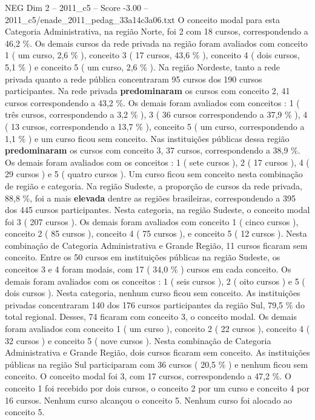\begin{textsample}{NEG Dim 2 – 2011\_c5 – Score -3.00 – 2011\_c5/enade\_2011\_pedag\_33a14c3a06.txt}
O conceito modal para esta Categoria Administrativa, na região Norte, foi 2 com 18 cursos, correspondendo a 46,2 \%.
Os demais cursos da rede privada na região foram avaliados com conceito 1 ( um curso, 2,6 \% ), conceito 3 ( 17 cursos, 43,6 \% ), conceito 4 ( dois cursos, 5,1 \% ) e conceito 5 ( um curso, 2,6 \% ).
Na região Nordeste, tanto a rede privada quanto a rede pública concentraram 95 cursos dos 190 cursos participantes.
Na rede privada \textbf{predominaram} os cursos com conceito 2, 41 cursos correspondendo a 43,2 \%.
Os demais foram avaliados com conceitos : 1 ( três cursos, correspondendo a 3,2 \% ), 3 ( 36 cursos correspondendo a 37,9 \% ), 4 ( 13 cursos, correspondendo a 13,7 \% ), conceito 5 ( um curso, correspondendo a 1,1 \% ) e um curso ficou sem conceito.
Nas instituições públicas dessa região \textbf{predominaram} os cursos com conceito 3, 37 cursos, correspondendo a 38,9 \%.
Os demais foram avaliados com os conceitos : 1 ( sete cursos ), 2 ( 17 cursos ), 4 ( 29 cursos ) e 5 ( quatro cursos ).
Um curso ficou sem conceito nesta combinação de região e categoria.
Na região Sudeste, a proporção de cursos da rede privada, 88,8 \%, foi a mais \textbf{elevada} dentre as regiões brasileiras, correspondendo a 395 dos 445 cursos participantes.
Nesta categoria, na região Sudeste, o conceito modal foi 3 ( 207 cursos ).
Os demais foram avaliados com conceito 1 ( cinco cursos ), conceito 2 ( 85 cursos ), conceito 4 ( 75 cursos ), e conceito 5 ( 12 cursos ).
Nesta combinação de Categoria Administrativa e Grande Região, 11 cursos ficaram sem conceito.
Entre os 50 cursos em instituições públicas na região Sudeste, os conceitos 3 e 4 foram modais, com 17 ( 34,0 \% ) cursos em cada conceito.
Os demais foram avaliados com os conceitos : 1 ( seis cursos ), 2 ( oito cursos ) e 5 ( dois cursos ).
Nesta categoria, nenhum curso ficou sem conceito.
As instituições privadas concentraram 140 dos 176 cursos participantes da região Sul, 79,5 \% do total regional.
Desses, 74 ficaram com conceito 3, o conceito modal.
Os demais foram avaliados com conceito 1 ( um curso ), conceito 2 ( 22 cursos ), conceito 4 ( 32 cursos ) e conceito 5 ( nove cursos ).
Nesta combinação de Categoria Administrativa e Grande Região, dois cursos ficaram sem conceito.
As instituições públicas na região Sul participaram com 36 cursos ( 20,5 \% ) e nenhum ficou sem conceito.
O conceito modal foi 3, com 17 cursos, correspondendo a 47,2 \%.
O conceito 1 foi recebido por dois cursos, o conceito 2 por um curso e conceito 4 por 16 cursos.
Nenhum curso alcançou o conceito 5.
Nenhum curso foi alocado ao conceito 5.

\end{textsample}
